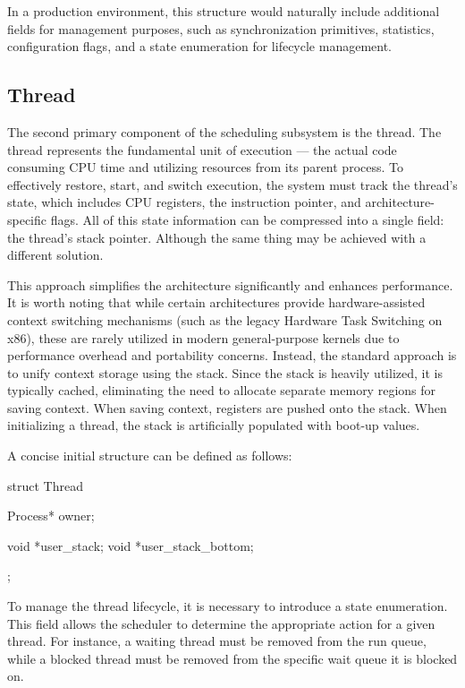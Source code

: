\documentclass[a4paper,10pt,twoside]{report}
\theoremstyle{definition}
\begin{document}
In a production environment, this structure would naturally include additional fields for management purposes, such as synchronization primitives, statistics, configuration flags, and a state enumeration for lifecycle management.

\subsection{Thread}

The second primary component of the scheduling subsystem is the thread. The thread represents the fundamental unit of execution --- the actual code consuming CPU time and utilizing resources from its parent process. To effectively restore, start, and switch execution, the system must track the thread's state, which includes CPU registers, the instruction pointer, and architecture-specific flags. All of this state information can be compressed into a single field: the thread's stack pointer. Although the same thing may be achieved with a different solution.

This approach simplifies the architecture significantly and enhances performance. It is worth noting that while certain architectures provide hardware-assisted context switching mechanisms (such as the legacy Hardware Task Switching on x86), these are rarely utilized in modern general-purpose kernels due to performance overhead and portability concerns. Instead, the standard approach is to unify context storage using the stack. Since the stack is heavily utilized, it is typically cached, eliminating the need to allocate separate memory regions for saving context. When saving context, registers are pushed onto the stack. When initializing a thread, the stack is artificially populated with boot-up values.

\noindent A concise initial structure can be defined as follows:

\clearpage

\begin{cppcode}[caption={Thread Structure First Iteration}, label={lst:os-tutorial-thread-v0}]
struct Thread {
    Process* owner;

    void *user_stack;
    void *user_stack_bottom;
};
\end{cppcode}

To manage the thread lifecycle, it is necessary to introduce a state enumeration. This field allows the scheduler to determine the appropriate action for a given thread. For instance, a waiting thread must be removed from the run queue, while a blocked thread must be removed from the specific wait queue it is blocked on.
\end{document}
